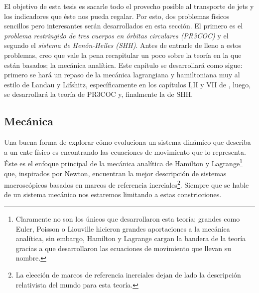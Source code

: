 
El objetivo de esta tesis es sacarle todo el provecho posible al transporte de jets y los indicadores que éste nos pueda regalar. Por esto, dos problemas físicos sencillos pero interesantes serán desarrollados en esta sección. El primero es el \textit{problema restringido de tres cuerpos en órbitas circulares (PR3COC)} y el segundo el \textit{sistema de Henón-Heiles (SHH)}. Antes de entrarle de lleno a estos problemas, creo que vale la pena recapitular un poco sobre la teoría en la que están basados; la mecánica analítica. Este capítulo se desarrollará como sigue: primero se hará un repaso de la mecánica lagrangiana y hamiltoniana muy al estilo de Landau y Lifshitz, específicamente en los capítulos I,II y VII de \cite{mechanics_landau_lifshitz}, luego, se desarrollará la teoría de PR3COC y, finalmente la de SHH.


\subsection{Mecánica}
\label{sec:mecanica}

Una buena forma de explorar cómo evoluciona un sistema dinámico que describa a un ente físico es encontrando las ecuaciones de movimiento que lo representa. Éste es el enfoque principal de la mecánica analítica de Hamilton y Lagrange\footnote{Claramente no son los únicos que desarrollaron esta teoría; grandes como Euler, Poisson o Liouville hicieron grandes aportaciones a la mecánica analítica, sin embargo, Hamilton y Lagrange cargan la bandera de la teoría gracias a que desarrollaron las ecuaciones de movimiento que llevan su nombre.} que, inspirados por Newton, encuentran la mejor descripción de sistemas macroscópicos basados en marcos de referencia inerciales\footnote{La elección de marcos de referencia inerciales dejan de lado la descripción relativista del mundo para esta teoría.}. Siempre que se hable de un sistema mecánico nos estaremos limitando a estas constricciones. 

